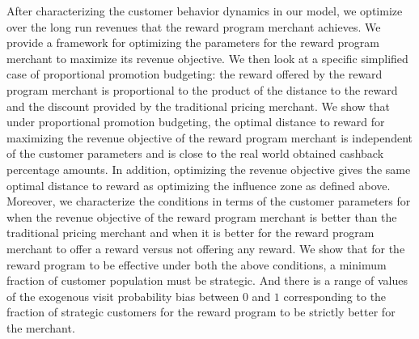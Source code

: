 After characterizing the customer behavior dynamics in our model, we optimize over the long run revenues that the reward program merchant achieves.
We provide a framework for optimizing the parameters for the reward program merchant to maximize its revenue objective.
We then look at a specific simplified case of proportional promotion budgeting: the reward offered by the reward program merchant is proportional to the product of the distance to the reward and the discount provided by the traditional pricing merchant.
We show that under proportional promotion budgeting, the optimal distance to reward for maximizing the revenue objective of the reward program merchant is independent of the customer parameters and is close to the real world obtained cashback percentage amounts.
{\arpit In addition, optimizing the revenue objective gives the same optimal distance to reward as optimizing the influence zone as defined above.}
Moreover, we characterize the conditions in terms of the customer parameters for when the revenue objective of the reward program merchant is better than the traditional pricing merchant and when it is better for the reward program merchant to offer a reward versus not offering any reward.
We show that for the reward program to be effective under both the above conditions, a minimum fraction of customer population must be strategic.
And there is a range of values of the exogenous visit probability bias between $0$ and $1$ corresponding to the fraction of strategic customers for the reward program to be strictly better for the merchant. 
